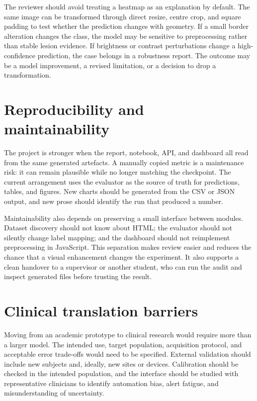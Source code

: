 The reviewer should avoid treating a heatmap as an explanation by default. The same image can be transformed through direct resize, centre crop, and square padding to test whether the prediction changes with geometry. If a small border alteration changes the class, the model may be sensitive to preprocessing rather than stable lesion evidence. If brightness or contrast perturbations change a high-confidence prediction, the case belongs in a robustness report. The outcome may be a model improvement, a revised limitation, or a decision to drop a transformation.

\section{Reproducibility and maintainability}
The project is stronger when the report, notebook, API, and dashboard all read from the same generated artefacts. A manually copied metric is a maintenance risk: it can remain plausible while no longer matching the checkpoint. The current arrangement uses the evaluator as the source of truth for predictions, tables, and figures. New charts should be generated from the CSV or JSON output, and new prose should identify the run that produced a number.

Maintainability also depends on preserving a small interface between modules. Dataset discovery should not know about HTML; the evaluator should not silently change label mapping; and the dashboard should not reimplement preprocessing in JavaScript. This separation makes review easier and reduces the chance that a visual enhancement changes the experiment. It also supports a clean handover to a supervisor or another student, who can run the audit and inspect generated files before trusting the result.

\section{Clinical translation barriers}
Moving from an academic prototype to clinical research would require more than a larger model. The intended use, target population, acquisition protocol, and acceptable error trade-offs would need to be specified. External validation should include new subjects and, ideally, new sites or devices. Calibration should be checked in the intended population, and the interface should be studied with representative clinicians to identify automation bias, alert fatigue, and misunderstanding of uncertainty.

